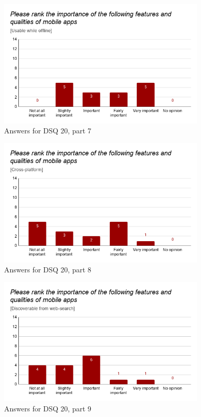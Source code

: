 \documentclass[a4paper,12pt]{article}
\begin{document}
\begin{figure}[ht!]
    \centering
    \includegraphics[width=10cm]{img/Results/dsq20_7.png}
    \caption{Answers for DSQ 20, part 7}
    \label{fig:res_devq20_7}
\end{figure}

\begin{figure}[ht!]
    \centering
    \includegraphics[width=10cm]{img/Results/dsq20_8.png}
    \caption{Answers for DSQ 20, part 8}
    \label{fig:res_devq20_8}
\end{figure}

\begin{figure}[ht!]
    \centering
    \includegraphics[width=10cm]{img/Results/dsq20_9.png}
    \caption{Answers for DSQ 20, part 9}
    \label{fig:res_devq20_9}
\end{figure}
\end{document}
